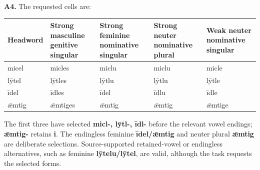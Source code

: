 \par\begin{minipage}{\linewidth}\raggedright
\textbf{A4.} The requested cells are:

\par\begingroup
\fontsize{10.5}{13.2}\selectfont
\setlength{\LTleft}{0pt}\setlength{\LTright}{\fill}
\noindent
\begin{tabular}{@{}>{\raggedright\arraybackslash}p{18.5mm}>{\raggedright\arraybackslash}p{23.75mm}>{\raggedright\arraybackslash}p{24.99mm}>{\raggedright\arraybackslash}p{22.75mm}>{\raggedright\arraybackslash}p{22.76mm}@{}}
\toprule
\textbf{Headword} & \textbf{Strong masculine genitive singular} & \textbf{Strong feminine nominative singular} & \textbf{Strong neuter nominative plural} & \textbf{Weak neuter nominative singular} \\
\midrule
micel & micles & miclu & miclu & micle \\
lȳtel & lȳtles & lȳtlu & lȳtlu & lȳtle \\
īdel & īdles & īdel & īdlu & īdle \\
ǣmtig & ǣmtiges & ǣmtig & ǣmtig & ǣmtige \\
\bottomrule
\end{tabular}
\par\endgroup

The first three have selected \textbf{micl-, lȳtl-, īdl-} before the relevant vowel endings; \textbf{ǣmtig-} retains \textbf{i}. The endingless feminine \textbf{īdel/\allowbreak{}ǣmtig} and neuter plural \textbf{ǣmtig} are deliberate selections. Source-supported retained-vowel or endingless alternatives, such as feminine \textbf{lȳtelu/\allowbreak{}lȳtel}, are valid, although the task requests the selected forms.

\end{minipage}\par\addvspace{4pt}

